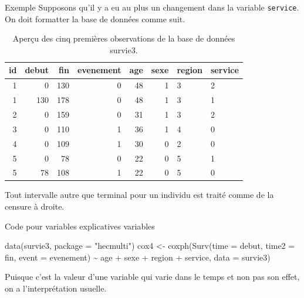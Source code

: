 \documentclass[
  ignorenonframetext,
]{beamer}
\newenvironment{Shaded}{\begin{snugshade}}{\end{snugshade}}
\newcommand{\AttributeTok}[1]{\textcolor[rgb]{0.40,0.45,0.13}{#1}}
\newcommand{\FunctionTok}[1]{\textcolor[rgb]{0.28,0.35,0.67}{#1}}
\newcommand{\NormalTok}[1]{\textcolor[rgb]{0.00,0.23,0.31}{#1}}
\newcommand{\OtherTok}[1]{\textcolor[rgb]{0.00,0.23,0.31}{#1}}
\newcommand{\SpecialCharTok}[1]{\textcolor[rgb]{0.37,0.37,0.37}{#1}}
\newcommand{\StringTok}[1]{\textcolor[rgb]{0.13,0.47,0.30}{#1}}
\begin{document}
\begin{frame}[fragile]{Exemple}
\protect\hypertarget{exemple}{}
Supposons qu'il y a eu au plus un changement dans la variable
\texttt{service}. On doit formatter la base de données comme suit.

\footnotesize

\hypertarget{tbl-survie3-donnees}{}
\begin{table}
\caption{\label{tbl-survie3-donnees}Aperçu des cinq premières observations de la base de données survie3. }\tabularnewline

\centering
\begin{tabular}{rrrrrrll}
\toprule
id & debut & fin & evenement & age & sexe & region & service\\
\midrule
1 & 0 & 130 & 0 & 48 & 1 & 3 & 2\\
1 & 130 & 178 & 0 & 48 & 1 & 3 & 1\\
2 & 0 & 159 & 0 & 31 & 1 & 3 & 2\\
3 & 0 & 110 & 1 & 36 & 1 & 4 & 0\\
4 & 0 & 109 & 1 & 30 & 0 & 2 & 0\\
5 & 0 & 78 & 0 & 22 & 0 & 5 & 1\\
5 & 78 & 108 & 1 & 22 & 0 & 5 & 0\\
\bottomrule
\end{tabular}
\end{table}

Tout intervalle autre que terminal pour un individu est traité comme de
la censure à droite.

\normalsize
\end{frame}

\begin{frame}[fragile]{Code pour variables explicatives variables}
\protect\hypertarget{code-pour-variables-explicatives-variables}{}
\begin{Shaded}
\begin{Highlighting}[numbers=left,,]
\FunctionTok{data}\NormalTok{(survie3, }\AttributeTok{package =} \StringTok{"hecmulti"}\NormalTok{)}
\NormalTok{cox4 }\OtherTok{\textless{}{-}} \FunctionTok{coxph}\NormalTok{(}\FunctionTok{Surv}\NormalTok{(}\AttributeTok{time =}\NormalTok{ debut, }
                   \AttributeTok{time2 =}\NormalTok{ fin, }
                   \AttributeTok{event =}\NormalTok{ evenement) }\SpecialCharTok{\textasciitilde{}} 
\NormalTok{                age }\SpecialCharTok{+}\NormalTok{ sexe }\SpecialCharTok{+}\NormalTok{ region }\SpecialCharTok{+}\NormalTok{ service, }
              \AttributeTok{data =}\NormalTok{ survie3)}
\end{Highlighting}
\end{Shaded}

\footnotesize

Puisque c'est la valeur d'une variable qui varie dans le temps et non
pas son effet, on a l'interprétation usuelle.

\normalsize
\end{frame}
\end{document}
